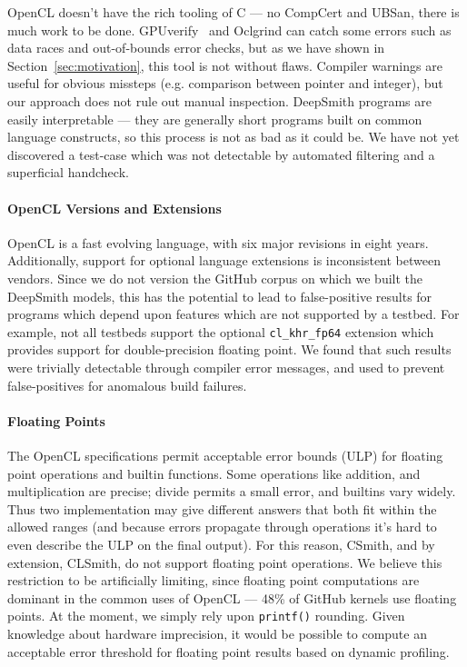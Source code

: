 OpenCL doesn't have the rich tooling of C --- no CompCert and UBSan, there is much work to be done. GPUverify~\cite{Betts2012} and Oclgrind can catch some errors such as data races and out-of-bounds error checks, but as we have shown in Section~\ref{sec:motivation}, this tool is not without flaws. Compiler warnings are useful for obvious missteps (e.g. comparison between pointer and integer), but our approach does not rule out manual inspection. DeepSmith programs are easily interpretable --- they are generally short programs built on common language constructs, so this process is not as bad as it could be. We have not yet discovered a test-case which was not detectable by automated filtering and a superficial handcheck.

\paragraph{OpenCL Versions and Extensions} OpenCL is a fast evolving language, with six major revisions in eight years. Additionally, support for optional language extensions is inconsistent between vendors. Since we do not version the GitHub corpus on which we built the DeepSmith models, this has the potential to lead to false-positive results for programs which depend upon features which are not supported by a testbed. For example, not all testbeds support the optional \texttt{cl\_khr\_fp64} extension which provides support for double-precision floating point. We found that such results were trivially detectable through compiler error messages, and used to prevent false-positives for anomalous build failures.

\paragraph{Floating Points} The OpenCL specifications permit acceptable error bounds (ULP) for floating point operations and builtin functions. Some operations like addition, and multiplication are precise; divide permits a small error, and builtins vary widely. Thus two implementation may give different answers that both fit within the allowed ranges (and because errors propagate through operations it's hard to even describe the ULP on the final output). For this reason, CSmith, and by extension, CLSmith, do not support floating point operations. We believe this restriction to be artificially limiting, since floating point computations are dominant in the common uses of OpenCL --- %
48\% of GitHub kernels use floating points. At the moment, we simply rely upon \texttt{printf()} rounding. Given knowledge about hardware imprecision, it would be possible to compute an acceptable error threshold for floating point results based on dynamic profiling.

